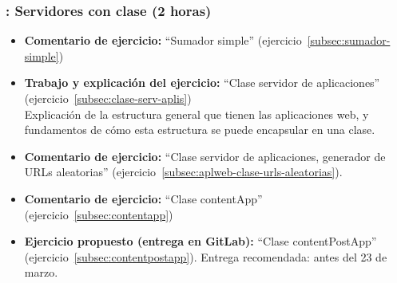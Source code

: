 \documentclass[a4paper,12pt]{article}
\begin{document}
\subsubsection{\lunesE: Servidores con clase (2 horas)}
\label{cal:lunesE}

\begin{itemize}
\item \textbf{Comentario de ejercicio:} ``Sumador simple'' (ejercicio~\ref{subsec:sumador-simple}) 
\item \textbf{Trabajo y explicación del ejercicio:} ``Clase servidor de aplicaciones'' (ejercicio~\ref{subsec:clase-serv-aplis}) \\
  Explicación de la estructura general que tienen las aplicaciones web, y fundamentos de cómo esta estructura se puede encapsular en una clase.
\item \textbf{Comentario de ejercicio:} ``Clase servidor de aplicaciones, generador de URLs aleatorias'' (ejercicio~\ref{subsec:aplweb-clase-urls-aleatorias}). 
 \item \textbf{Comentario de ejercicio:}  ``Clase contentApp'' (ejercicio~\ref{subsec:contentapp}) 
 \item \textbf{Ejercicio propuesto (entrega en GitLab):} ``Clase contentPostApp'' (ejercicio~\ref{subsec:contentpostapp}).
  Entrega recomendada: antes del 23 de marzo.
\end{itemize}



\end{document}
